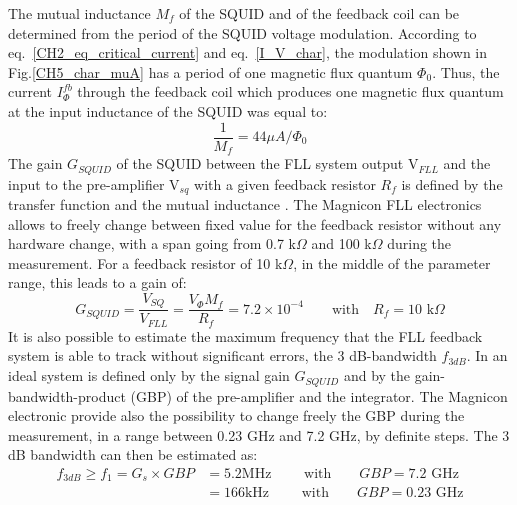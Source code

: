\documentclass[12pt,a4paper]{report}
\begin{document}
        The mutual inductance $M_f$ of the SQUID and of the feedback coil can be determined from the period of the SQUID voltage modulation. According to eq.~\ref{CH2_eq_critical_current} and eq.~\ref{I_V_char}, the modulation shown in Fig.\ref{CH5_char_muA} has a period of one magnetic flux quantum $\Phi_0$. Thus, the current $I_\Phi^{fb}$ through the feedback coil which produces one magnetic flux quantum at the input inductance of the SQUID was equal to:
        \begin{equation}
       	 \frac{1}{M_f} = 44 \mu A/\Phi_0
        \end{equation}
        The gain $G_{SQUID}$ of the SQUID between the FLL system output V$_{FLL}$ and the input to the pre-amplifier V$_{sq}$ with a given feedback resistor $R_f$ is defined by the transfer function and the mutual inductance \cite{Squid_handbook_1}. The Magnicon FLL electronics allows to freely change between fixed value for the feedback resistor without any hardware change, with a span going from 0.7 k$\Omega$ and 100 k$\Omega$ during the measurement. For a feedback resistor of 10 k$\Omega$, in the middle of the parameter range, this leads to a gain of:
        \begin{equation}
        	G_{SQUID} = \frac{V_{SQ}}{V_{FLL}} = \frac{V_\Phi M_f}{R_f} = 7.2 \times 10^{-4} \qquad \text{with} \quad R_f=10\text{ k}\Omega
        \end{equation}
        It is also possible to estimate the maximum frequency that the FLL feedback system is able to track without significant errors, the 3 dB-bandwidth $f_{3dB}$. In an ideal system is defined only by the signal gain $G_{SQUID}$ and by the gain-bandwidth-product (GBP) of the pre-amplifier and the integrator. The Magnicon electronic provide also the possibility to change freely the GBP during the measurement, in a range between 0.23 GHz and 7.2 GHz, by definite steps. The 3 dB bandwidth can then be estimated as:
        \begin{align*}
        	f_{3 dB}\geq f_1 = G_s \times GBP &= 5.2 \text{MHz} \qquad \text{ with} \qquad GBP = 7.2 \text{ GHz} \\
        	 &= 166 \text{kHz} \qquad \text{ with} \qquad GBP = 0.23 \text{ GHz}
        \end{align*}
\end{document}
